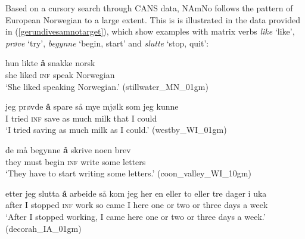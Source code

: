 \documentclass[output=paper,colorlinks,citecolor=brown]{langscibook}
\begin{document}
Based on a cursory search through CANS data, NAmNo follows the pattern of European Norwegian to a large extent. This is is illustrated in the data provided in (\ref{gerundivesamnotarget}), which show examples with matrix verbs \textit{like} `like', \textit{prøve} `try', \textit{begynne} `begin, start' and \textit{slutte} `stop, quit':


\begin{exe} 

\item \label{gerundivesamnotarget}

\begin{xlist}


\item \label{gerundivestarget1} \gll hun likte \textbf{{\aa}} snakke norsk \\
        she liked \textsc{inf} speak Norwegian \\
         \glt `She liked speaking Norwegian.' \hfill(stillwater\_MN\_01gm)

\item \label{gerundivestarget2} \gll jeg prøvde \textbf{{\aa}} spare så mye mjølk som jeg kunne  \\
        I tried \textsc{inf} save as much milk that I could  \\
         \glt `I tried saving as much milk as I could.' \hfill(westby\_WI\_01gm)
         
\item \label{gerundivestarget3} \gll de må begynne \textbf{{\aa}} skrive noen brev \\
        they must begin \textsc{inf} write some letters \\
         \glt `They have to start writing some letters.' \hfill(coon\_valley\_WI\_10gm)

\item \label{gerundivestarget4} \gll etter jeg slutta \textbf{{\aa}} arbeide så kom jeg her en eller to eller tre dager i uka \\
        after I stopped \textsc{inf} work so came I here one or two or three days a week  \\
         \glt `After I stopped working, I came here one or two or three days a week.' \hfill(decorah\_IA\_01gm)

\end{xlist}
\end{exe}
\end{document}
